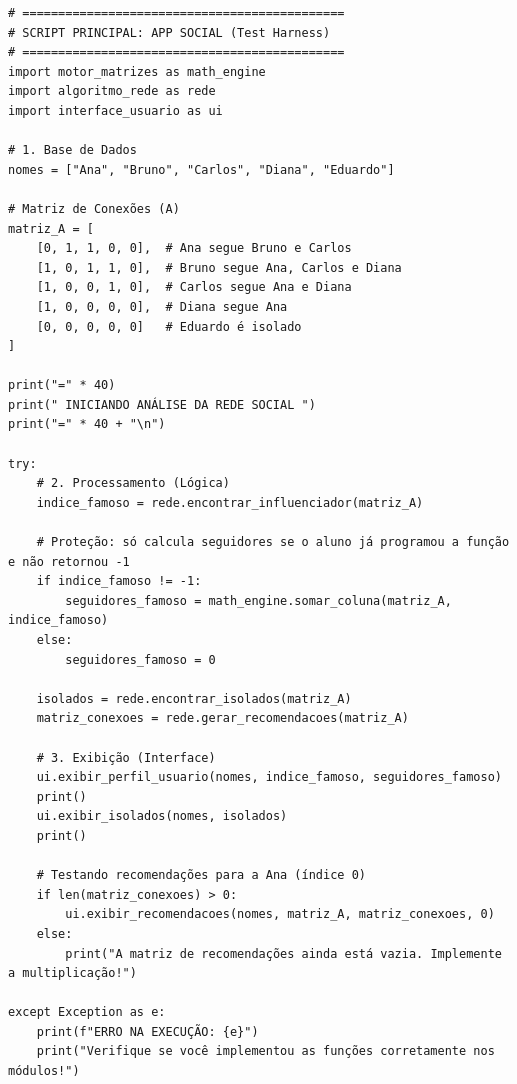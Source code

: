 \documentclass[../numerical_methods.tex]{subfiles}
\begin{document}
\begin{listing}[H]
	\caption{\textbf{Redes Sociais:} Painel de Testes}
	\begin{verbatim}
# =============================================
# SCRIPT PRINCIPAL: APP SOCIAL (Test Harness)
# =============================================
import motor_matrizes as math_engine
import algoritmo_rede as rede
import interface_usuario as ui

# 1. Base de Dados
nomes = ["Ana", "Bruno", "Carlos", "Diana", "Eduardo"]

# Matriz de Conexões (A)
matriz_A = [
    [0, 1, 1, 0, 0],  # Ana segue Bruno e Carlos
    [1, 0, 1, 1, 0],  # Bruno segue Ana, Carlos e Diana
    [1, 0, 0, 1, 0],  # Carlos segue Ana e Diana
    [1, 0, 0, 0, 0],  # Diana segue Ana
    [0, 0, 0, 0, 0]   # Eduardo é isolado
]

print("=" * 40)
print(" INICIANDO ANÁLISE DA REDE SOCIAL ")
print("=" * 40 + "\n")

try:
    # 2. Processamento (Lógica)
    indice_famoso = rede.encontrar_influenciador(matriz_A)

    # Proteção: só calcula seguidores se o aluno já programou a função e não retornou -1
    if indice_famoso != -1:
        seguidores_famoso = math_engine.somar_coluna(matriz_A, indice_famoso)
    else:
        seguidores_famoso = 0

    isolados = rede.encontrar_isolados(matriz_A)
    matriz_conexoes = rede.gerar_recomendacoes(matriz_A)

    # 3. Exibição (Interface)
    ui.exibir_perfil_usuario(nomes, indice_famoso, seguidores_famoso)
    print()
    ui.exibir_isolados(nomes, isolados)
    print()

    # Testando recomendações para a Ana (índice 0)
    if len(matriz_conexoes) > 0:
        ui.exibir_recomendacoes(nomes, matriz_A, matriz_conexoes, 0)
    else:
        print("A matriz de recomendações ainda está vazia. Implemente a multiplicação!")

except Exception as e:
    print(f"ERRO NA EXECUÇÃO: {e}")
    print("Verifique se você implementou as funções corretamente nos módulos!")
 \end{verbatim}
\end{listing}
\end{document}
